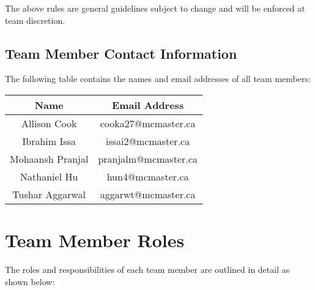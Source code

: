 \documentclass{article}
\begin{document}
The above rules are general guidelines subject to change and will be enforced at team discretion.

\subsection{Team Member Contact Information}

The following table contains the names and email addresses of all team members:

\begin{table}
\centering
\label{TblContactInfo}
\begin{tabular}{| c | c |}
\hline
\textbf{Name} & \textbf{Email Address} \\
\hline
Allison Cook & cooka27@mcmaster.ca \\
\hline
Ibrahim Issa & issai2@mcmaster.ca \\
\hline
Mohaansh Pranjal & pranjalm@mcmaster.ca \\
\hline
Nathaniel Hu & hun4@mcmaster.ca \\
\hline
Tushar Aggarwal & aggarwt@mcmaster.ca \\
\hline
\end{tabular}
\end{table}

\section{Team Member Roles}

The roles and responsibilities of each team member are outlined in detail as shown below: \\
\end{document}
